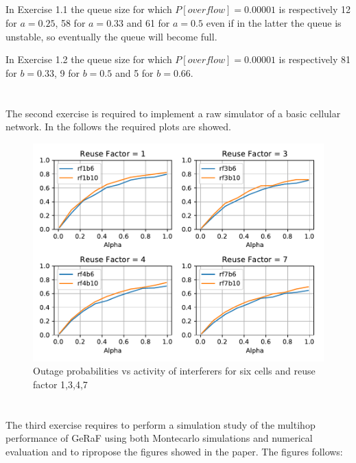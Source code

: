 \documentclass[11pt,a4paper]{article}
\begin{document}
\subsection{}
In Exercise 1.1 the queue size for which $P[overflow]=0.00001$ is respectively 12 for $a=0.25$, 58 for $a=0.33$ and 61 for $a=0.5$ even if in the latter the queue is unstable, so eventually the queue will become full.

In Exercise 1.2 the queue size for which $P[overflow]=0.00001$ is respectively 81 for $b=0.33$, 9 for $b=0.5$ and 5 for $b=0.66$.
\newpage
\section{}
The second exercise is required to implement a raw simulator of a basic cellular network. In the follows the required plots are showed.

\begin{figure}[ht]
  \centering
  \includegraphics[width=\linewidth]{outage_montecarlo}
  \caption{Outage probabilities vs activity of interferers for six cells and reuse factor 1,3,4,7}
  \label{fig:outage}
\end{figure}

\section{}
The third exercise requires to perform a simulation study of the multihop performance of GeRaF using both Montecarlo simulations and numerical evaluation and to ripropose the figures showed in the paper.
The figures follows:
\end{document}
